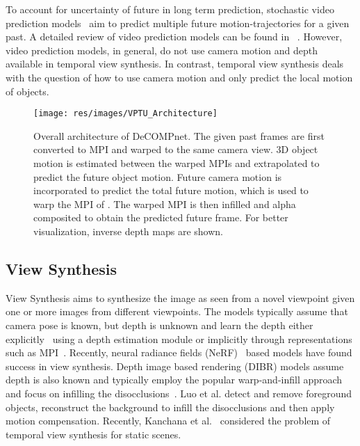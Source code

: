 \documentclass[preprint]{vgtc}
\def\etal{et al.}
\begin{document}
    To account for uncertainty of future in long term prediction, stochastic video prediction models~\cite{babaeizadeh2018stochastic,denton2018stochastic,villegas2019high} aim to predict multiple future motion-trajectories for a given past.
A detailed review of video prediction models can be found in ~\cite{oprea2020review}.
    However, video prediction models, in general, do not use camera motion and depth available in temporal view synthesis.
    In contrast, temporal view synthesis deals with the question of how to use camera motion and only predict the local motion of objects.


    \begin{figure*}
        \centering
        \texttt{[image: res/images/VPTU\_Architecture]}
        \caption{Overall architecture of DeCOMPnet.
        The given past frames are first converted to MPI and warped to the same camera view.
        3D object motion is estimated between the warped MPIs and extrapolated to predict the future object motion.
        Future camera motion is incorporated to predict the total future motion, which is used to warp the MPI of .
        The warped MPI is then infilled and alpha composited to obtain the predicted future frame.
        For better visualization, inverse depth maps are shown.}
        \label{fig:architecture}
    \end{figure*}

    \subsection{View Synthesis}\label{subsec:related-work-view-synthesis}
    View Synthesis aims to synthesize the image as seen from a novel viewpoint given one or more images from different viewpoints.
    The models typically assume that camera pose is known, but depth is unknown and learn the depth either explicitly~\cite{wiles2020synsin,shih20203dp} using a depth estimation module or implicitly through representations such as MPI~\cite{zhou2018stereomag,srinivasan2019pushing}.
    Recently, neural radiance fields (NeRF)~\cite{mildenhall2020nerf} based models have found success in view synthesis.
    Depth image based rendering (DIBR) models assume depth is also known and typically employ the popular warp-and-infill approach and focus on infilling the disocclusions~\cite{cho2017hole,luo2020disocclusion}.
    Luo \etal\cite{luo2016hole} detect and remove foreground objects, reconstruct the background to infill the disocclusions and then apply motion compensation.
    Recently, Kanchana \etal~\cite{kanchana2022ivp} considered the problem of temporal view synthesis for static scenes.
\end{document}
